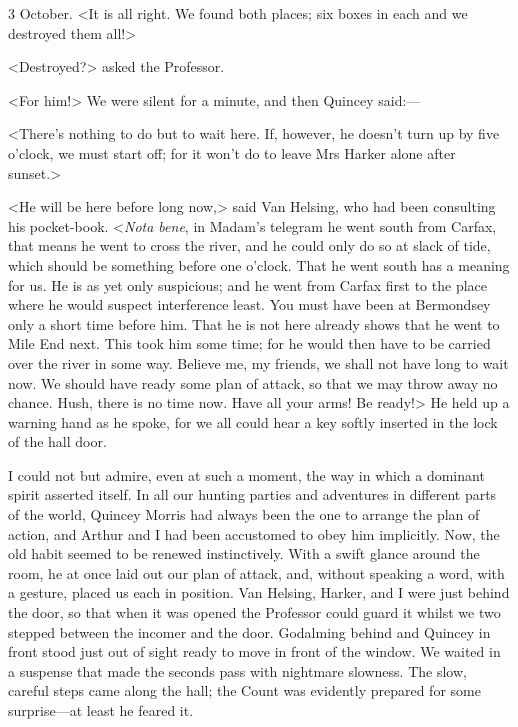 \begin{diary}{3 October.}
<It is all right. We found both places; six boxes in each and we destroyed them all!>

<Destroyed?> asked the Professor.

<For him!> We were silent for a minute, and then Quincey said:—

<There's nothing to do but to wait here. If, however, he doesn't turn up by five o'clock, we must start off; for it won't do to leave Mrs Harker alone after sunset.>

<He will be here before long now,> said Van Helsing, who had been consulting his pocket-book. <\textit{Nota bene}, in Madam's telegram he went south from Carfax, that means he went to cross the river, and he could only do so at slack of tide, which should be something before one o'clock. That he went south has a meaning for us. He is as yet only suspicious; and he went from Carfax first to the place where he would suspect interference least. You must have been at Bermondsey only a short time before him. That he is not here already shows that he went to Mile End next. This took him some time; for he would then have to be carried over the river in some way. Believe me, my friends, we shall not have long to wait now. We should have ready some plan of attack, so that we may throw away no chance. Hush, there is no time now. Have all your arms! Be ready!> He held up a warning hand as he spoke, for we all could hear a key softly inserted in the lock of the hall door.

I could not but admire, even at such a moment, the way in which a dominant spirit asserted itself. In all our hunting parties and adventures in different parts of the world, Quincey Morris had always been the one to arrange the plan of action, and Arthur and I had been accustomed to obey him implicitly. Now, the old habit seemed to be renewed instinctively. With a swift glance around the room, he at once laid out our plan of attack, and, without speaking a word, with a gesture, placed us each in position. Van Helsing, Harker, and I were just behind the door, so that when it was opened the Professor could guard it whilst we two stepped between the incomer and the door. Godalming behind and Quincey in front stood just out of sight ready to move in front of the window. We waited in a suspense that made the seconds pass with nightmare slowness. The slow, careful steps came along the hall; the Count was evidently prepared for some surprise—at least he feared it.


\end{diary}
